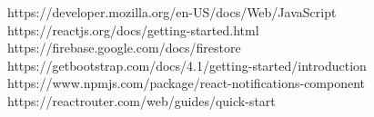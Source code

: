 \documentclass[conference]{IEEEtran}
\begin{document}

\begin{thebibliography}{00}
 https://developer.mozilla.org/en-US/docs/Web/JavaScript
 https://reactjs.org/docs/getting-started.html
 https://firebase.google.com/docs/firestore
 https://getbootstrap.com/docs/4.1/getting-started/introduction
 https://www.npmjs.com/package/react-notifications-component
 https://reactrouter.com/web/guides/quick-start
\end{thebibliography}
\end{document}
